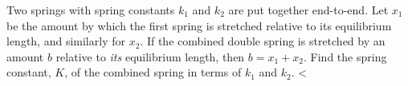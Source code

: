         Two springs with spring constants $k_1$ and $k_2$ are put together end-to-end. Let
        $x_1$ be the amount by which the first spring is stretched relative to
        its equilibrium length, and similarly for $x_2$. If the combined double
        spring is stretched by an amount $b$ relative to \emph{its} equilibrium
        length, then $b=x_1+x_2$. Find the spring constant, $K$, of the combined
        spring in terms of $k_1$ and $k_2$.
        <%
\answercheck\hwendpart

